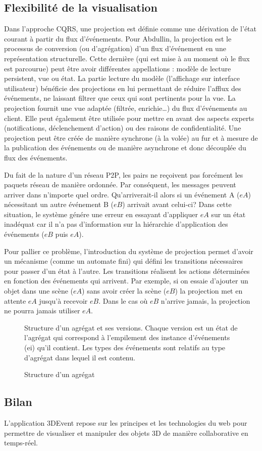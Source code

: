 \subsection{Flexibilité de la visualisation}
\label{sec:flexviz}
Dans l'approche \gls{CQRS}, une projection est définie comme une dérivation de l'état courant à 
partir du flux d'événements. Pour Abdullin, \og la projection est le processus de 
conversion (ou d'agrégation) d'un flux d'événement en une représentation 
structurelle. Cette dernière (qui est mise à au moment où le flux est parcourue) 
peut être avoir différentes appellations : modèle de lecture persistent, vue ou 
état.\fg{}
La partie lecture du modèle (l'affichage sur interface utilisateur) bénéficie des 
projections en lui permettant de réduire l'afflux des événements, ne laissant filtrer 
que ceux qui sont pertinents pour la vue. La projection fournit une vue adaptée 
(filtrée, enrichie\ldots) du flux d'événements au client. Elle peut également être 
utilisée pour mettre en avant des aspects experts (notifications, déclenchement 
d'action) ou des raisons de confidentialité.
Une projection peut être créée de manière synchrone (à la volée) au fur et à 
mesure de la publication des événements ou de manière asynchrone et donc 
découplée du flux des événements. 


Du fait de la nature d'un réseau \gls{P2P}, les pairs ne reçoivent pas forcément les 
paquets réseau de manière ordonnée.
Par conséquent, les messages peuvent arriver dans n'importe quel ordre.
Qu'arriverait-il alors si un événement A ($eA$) nécessitant un autre événement B ($eB$) arrivait avant celui-ci? Dans cette situation, le système génére une 
erreur en essayant d'appliquer $eA$ sur un état inadéquat car il n'a pas 
d'information sur la hiérarchie d'application des événements ($eB$ puis $eA$).

Pour pallier ce problème, l'introduction du système de projection permet d'avoir un 
mécanisme (comme un automate fini) qui défini les transitions nécessaires pour 
passer d'un état à l'autre. Les transitions réalisent les actions déterminées en fonction des 
événements qui arrivent. Par exemple, si on essaie d'ajouter un objet dans une 
scène  ($eA$) sans avoir créer la scène ($eB$) la projection met en attente $eA$ 
jusqu'à recevoir $eB$. Dans le cas où $eB$ n'arrive jamais, la projection ne pourra 
jamais utiliser $eA$.

\begin{figure}
	\centering
	\caption{Structure d'un agrégat}{Structure d'un agrégat et ses versions. Chaque 
	version est un état de l'agrégat qui correspond à l'empilement des instance 
	d'événements (ei) qu'il contient. Les types des événements sont relatifs au type 
	d'agrégat dans lequel il est contenu.}
	\label{fig:aggregate}
\end{figure}

\subsection{Bilan}

 L'application 3DEvent repose sur les principes et les 
technologies du web pour permettre de visualiser et manipuler des objets \gls{3D} 
de 
manière 
collaborative en temps-réel.